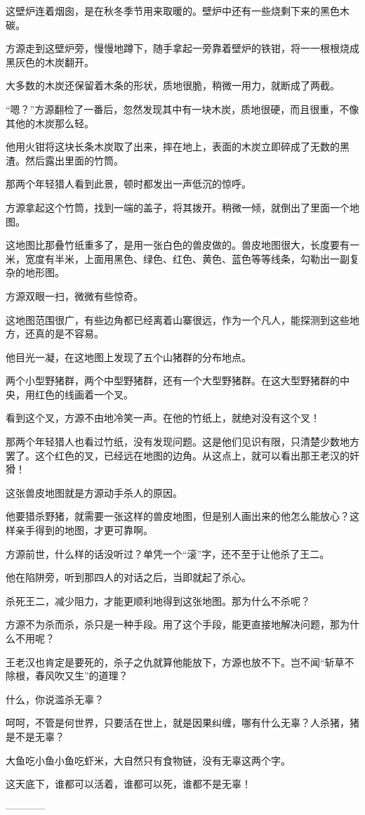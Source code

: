 \begin{this_body}
这壁炉连着烟囱，是在秋冬季节用来取暖的。壁炉中还有一些烧剩下来的黑色木碳。

方源走到这壁炉旁，慢慢地蹲下，随手拿起一旁靠着壁炉的铁钳，将一一根根烧成黑灰色的木炭翻开。

大多数的木炭还保留着木条的形状，质地很脆，稍微一用力，就断成了两截。

“嗯？”方源翻检了一番后，忽然发现其中有一块木炭，质地很硬，而且很重，不像其他的木炭那么轻。

他用火钳将这块长条木炭取了出来，摔在地上，表面的木炭立即碎成了无数的黑渣。然后露出里面的竹筒。

那两个年轻猎人看到此景，顿时都发出一声低沉的惊呼。

方源拿起这个竹筒，找到一端的盖子，将其拨开。稍微一倾，就倒出了里面一个地图。

这地图比那叠竹纸重多了，是用一张白色的兽皮做的。兽皮地图很大，长度要有一米，宽度有半米，上面用黑色、绿色、红色、黄色、蓝色等等线条，勾勒出一副复杂的地形图。

方源双眼一扫，微微有些惊奇。

这地图范围很广，有些边角都已经离着山寨很远，作为一个凡人，能探测到这些地方，还真的是不容易。

他目光一凝，在这地图上发现了五个山猪群的分布地点。

两个小型野猪群，两个中型野猪群，还有一个大型野猪群。在这大型野猪群的中央，用红色的线画着一个叉。

看到这个叉，方源不由地冷笑一声。在他的竹纸上，就绝对没有这个叉！

那两个年轻猎人也看过竹纸，没有发现问题。这是他们见识有限，只清楚少数地方罢了。这个红色的叉，已经远在地图的边角。从这点上，就可以看出那王老汉的奸猾！

这张兽皮地图就是方源动手杀人的原因。

他要猎杀野猪，就需要一张这样的兽皮地图，但是别人画出来的他怎么能放心？这样亲手得到的地图，才更可靠啊。

方源前世，什么样的话没听过？单凭一个“滚”字，还不至于让他杀了王二。

他在陷阱旁，听到那四人的对话之后，当即就起了杀心。

杀死王二，减少阻力，才能更顺利地得到这张地图。那为什么不杀呢？

方源不为杀而杀，杀只是一种手段。用了这个手段，能更直接地解决问题，那为什么不用呢？

王老汉也肯定是要死的，杀子之仇就算他能放下，方源也放不下。岂不闻“斩草不除根，春风吹又生”的道理？

什么，你说滥杀无辜？

呵呵，不管是何世界，只要活在世上，就是因果纠缠，哪有什么无辜？人杀猪，猪是不是无辜？

大鱼吃小鱼小鱼吃虾米，大自然只有食物链，没有无辜这两个字。

这天底下，谁都可以活着，谁都可以死，谁都不是无辜！

------------

\end{this_body}

